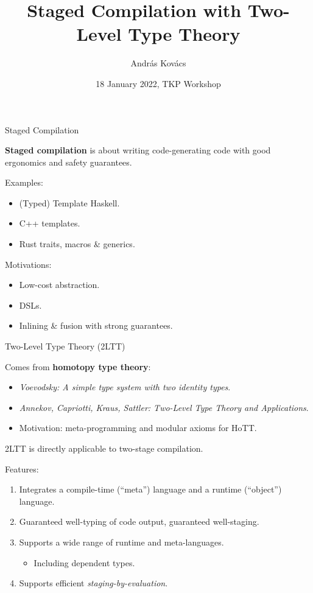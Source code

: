 \documentclass[dvipsnames,aspectratio=169]{beamer}
\title{Staged Compilation with Two-Level Type Theory}
\author{András Kovács}
\institute{
  {Eötvös Loránd University}
}
\date{18 January 2022, TKP Workshop}
\theoremstyle{remark}
\begin{document}
\frame{\titlepage}

\begin{frame}{Staged Compilation}

\begin{block}{}
\textbf{Staged compilation} is about writing code-generating code with good ergonomics
and safety guarantees.
\end{block}
\vspace{1em}
\pause

Examples:
\begin{itemize}
  \item (Typed) Template Haskell.
  \item C++ templates.
  \item Rust traits, macros \& generics.
\end{itemize}
\vspace{1em}
\pause

Motivations:
\begin{itemize}
  \item Low-cost abstraction.
  \item DSLs.
  \item Inlining \& fusion with strong guarantees.
\end{itemize}

\end{frame}

\begin{frame}{Two-Level Type Theory (2LTT)}

Comes from \textbf{homotopy type theory}:
\begin{itemize}
  \item \emph{Voevodsky: A simple type system with two identity types}.
  \item \emph{Annekov, Capriotti, Kraus, Sattler: Two-Level Type Theory and Applications}.
  \item Motivation: meta-programming and modular axioms for HoTT.
\end{itemize}
\vspace{1em}
\pause

2LTT is directly applicable to two-stage compilation.
\vspace{1em}
\pause

Features:
\begin{enumerate}
\item Integrates a compile-time (``meta'') language and a runtime (``object'') language.
\pause
\item Guaranteed well-typing of code output, guaranteed well-staging.
\pause
\item Supports a wide range of runtime and meta-languages.
  \begin{itemize}
  \pause
  \item \alert{Including dependent types}.
  \end{itemize}
\pause
\item Supports efficient \emph{staging-by-evaluation}.
\end{enumerate}
\vspace{1em}
\end{frame}
\end{document}
